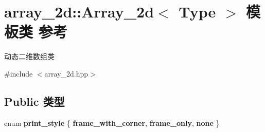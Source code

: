 \hypertarget{classarray__2d_1_1_array__2d}{}\section{array\+\_\+2d\+:\+:Array\+\_\+2d$<$ Type $>$ 模板类 参考}
\label{classarray__2d_1_1_array__2d}


动态二维数组类  




{\ttfamily \#include $<$array\+\_\+2d.\+hpp$>$}

\subsection*{Public 类型}
\begin{DoxyCompactItemize}
\item 
\mbox{\label{classarray__2d_1_1_array__2d_a71a2f6542c925b3851cf79ce7ffd3439}} 
enum {\bfseries print\+\_\+style} \{ {\bfseries frame\+\_\+with\+\_\+corner}, 
{\bfseries frame\+\_\+only}, 
{\bfseries none}
 \}
\end{DoxyCompactItemize}
